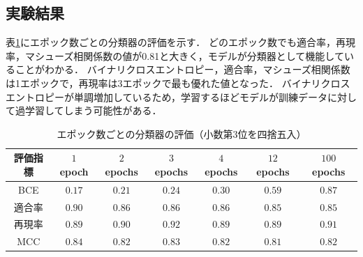 \documentclass[12pt,a4j]{jreport}
\begin{document}
\subsection{実験結果}
表\ref{ibm_classification_evaluation}にエポック数ごとの分類器の評価を示す．
どのエポック数でも適合率，再現率，マシューズ相関係数の値が0.81と大きく，モデルが分類器として機能していることがわかる．
バイナリクロスエントロピー，適合率，マシューズ相関係数は1エポックで，再現率は3エポックで最も優れた値となった．
バイナリクロスエントロピーが単調増加しているため，学習するほどモデルが訓練データに対して過学習してしまう可能性がある．

\begin{table}[H]
  \caption{
    エポック数ごとの分類器の評価（小数第3位を四捨五入）
    }
  \centering
  \vspace{4mm}
    \begin{tabular}{ccccccc}
    \hline
    評価指標 & $1$ epoch & $2$ epochs & $3$ epochs & $4$ epochs & $12$ epochs & $100$ epochs
    \\
    \hline
    BCE & $\mathbf{0.17}$ & $0.21$ & $0.24$ & $0.30$ & $0.59$ & $0.87$
    \\
    適合率 & $\mathbf{0.90}$ & $0.86$ & $0.86$ & $0.86$ & $0.85$ & $0.85$
    \\
    再現率 & $0.89$ & $0.90$ & $\mathbf{0.92}$ & $0.89$ & $0.89$ & $0.91$
    \\
    MCC & $\mathbf{0.84}$ & $0.82$ & $0.83$ & $0.82$ & $0.81$ & $0.82$
    \\
    \hline
    \end{tabular}
  \label{ibm_classification_evaluation}
\end{table}
\end{document}
